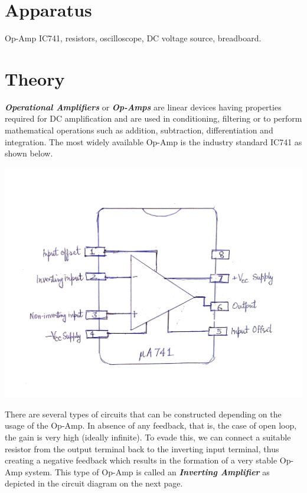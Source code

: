 \section{Apparatus}
\noindent Op-Amp IC741, resistors, oscilloscope, DC voltage source, breadboard.
\section{Theory}
\noindent \textbf{\emph{Operational Amplifiers}} or \textbf{\emph{Op-Amps}} are linear devices having properties required for DC amplification and are used in conditioning, filtering or to perform mathematical operations such as addition, subtraction, differentiation and integration.
\newline The most widely available Op-Amp is the industry standard IC741 as shown below.
\begin{center}
    \includegraphics[scale = 0.15]{OPAMP Config/IC741.jpg}
\end{center}
\noindent There are several types of circuits that can be constructed depending on the usage of the Op-Amp. In absence of any feedback, that is, the case of open loop, the gain is very high (ideally infinite). To evade this, we can connect a suitable resistor from the output terminal back to the inverting input terminal, thus creating a negative feedback which results in the formation of a very stable Op-Amp system. This type of Op-Amp is called an \textbf{\emph{Inverting Amplifier}} as depicted in the circuit diagram on the next page.
\clearpage
